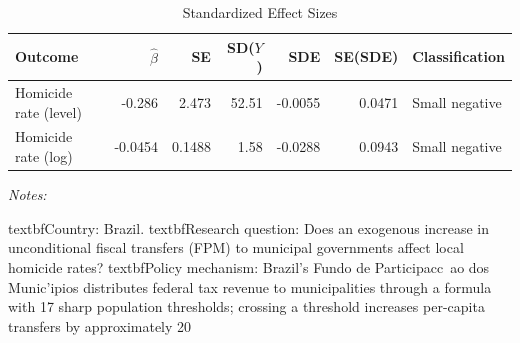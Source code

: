 \begin{table}[!h]
\centering
\caption{\label{tab:sde}Standardized Effect Sizes}
\centering
\begin{threeparttable}
\begin{tabular}[t]{lrrrrrl}
\toprule
Outcome & $\hat{\beta}$ & SE & SD($Y$) & SDE & SE(SDE) & Classification\\
\midrule
Homicide rate (level) & -0.286 & 2.473 & 52.51 & -0.0055 & 0.0471 & Small negative\\
Homicide rate (log) & -0.0454 & 0.1488 & 1.58 & -0.0288 & 0.0943 & Small negative\\
\bottomrule
\end{tabular}
\begin{tablenotes}
\item \textit{Notes:} 
\item textbf{Country:} Brazil. textbf{Research question:} Does an exogenous increase in unconditional fiscal transfers (FPM) to municipal governments affect local homicide rates? textbf{Policy mechanism:} Brazil's Fundo de Participac{c}~{a}o dos Munic'{i}pios distributes federal tax revenue to municipalities through a formula with 17 sharp population thresholds; crossing a threshold increases per-capita transfers by approximately 20%
\end{tablenotes}
\end{threeparttable}
\end{table}

